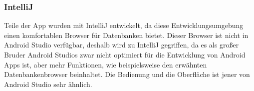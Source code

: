 \documentclass[FIPLY_base.tex]{subfiles}
\begin{document}
\subsubsection{IntelliJ}
Teile der App wurden mit IntelliJ entwickelt, da diese Entwicklungsumgebung einen komfortablen Browser für Datenbanken bietet.
Dieser Browser ist nicht in Android Studio verfügbar, deshalb wird zu IntelliJ gegriffen, da es als großer Bruder Android Studios zwar nicht optimiert für die Entwicklung von Android Apps ist, aber mehr Funktionen, wie beispielsweise den erwähnten Datenbankenbrowser beinhaltet.
Die Bedienung und die Oberfläche ist jener von Android Studio sehr ähnlich. 
\end{document}
